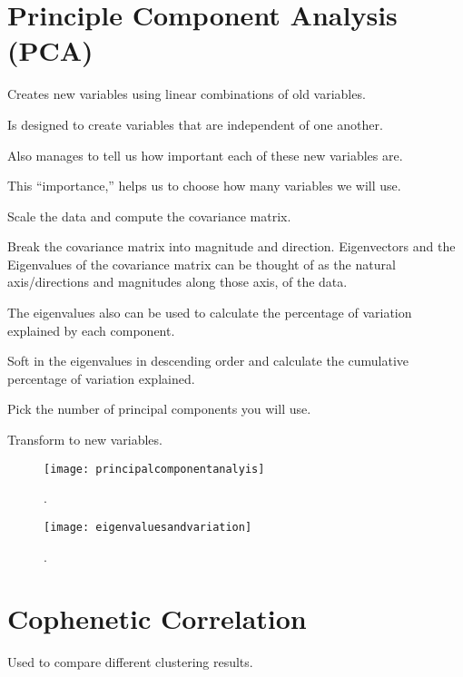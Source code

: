 	\section{Principle Component Analysis (PCA)}
	\begin{bulletedlist}
		\item Creates new variables using linear combinations of old variables.
		\item Is designed to create variables that are independent of one another.
		\item Also manages to tell us how important each of these new variables are.
		\item This ``importance,'' helps us to choose how many variables we will use.
		\item Scale the data and compute the covariance matrix.
		\item Break the covariance matrix into magnitude and direction. Eigenvectors and the Eigenvalues of the covariance matrix can be thought of as the natural axis/directions and magnitudes along those axis, of the data.
		\begin{bulletedlist}
			\item The eigenvalues also can be used to calculate the percentage of variation explained by each component.
		\end{bulletedlist}
		\item Soft in the eigenvalues in descending order and calculate the cumulative percentage of variation explained.
		\item Pick the number of principal components you will use.
		\item Transform to new variables.
	\end{bulletedlist}

	\begin{figure}[h]
		\centering
		\texttt{[image: principalcomponentanalyis]}
		\caption{.}
		\label{fig:principalcomponentanalyis}
	\end{figure}
 	\begin{figure}[h]
		\centering
		\texttt{[image: eigenvaluesandvariation]}
		\caption{.}
		\label{fig:eigenvaluesandvariation}
	\end{figure}

	\section{Cophenetic Correlation}
Used to compare different clustering results.

